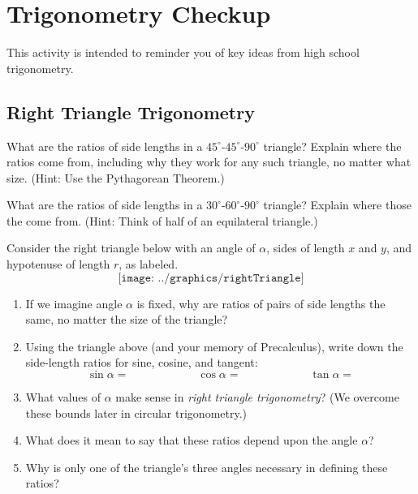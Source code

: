 \newpage 

\section{Trigonometry Checkup}
This activity is intended to reminder you of key ideas from high school trigonometry. 

\subsection{Right Triangle Trigonometry}
\begin{prob}
What are the ratios of side lengths in a $45^\circ$-$45^\circ$-$90^\circ$ triangle?  Explain where the ratios come from, including why they work for any such triangle, no matter what size.  (Hint: Use the Pythagorean Theorem.)
\end{prob}

\vspace{0.1in}

\begin{prob}
What are the ratios of side lengths in a $30^\circ$-$60^\circ$-$90^\circ$ triangle?  Explain where those the come from.  (Hint: Think of half of an equilateral triangle.)
\end{prob}

\vspace{0.1in}

\begin{prob}
Consider the right triangle below with an angle of $\alpha$, sides of length $x$ and $y$, and hypotenuse of length $r$, as labeled.  
$$\texttt{[image: ../graphics/rightTriangle]}$$
\begin{enumerate}
\itemsep 12pt
\item If we imagine angle $\alpha$ is fixed, why are ratios of pairs of side lengths the same, no matter the size of the triangle?
\item Using the triangle above (and your memory of Precalculus), write down the side-length ratios for sine, cosine, and tangent:  
$$\sin\alpha = \hspace{1in} \cos\alpha = \hspace{1in} \tan\alpha =$$
\item What values of $\alpha$ make sense in \emph{right triangle trigonometry}?  (We overcome these bounds later in circular trigonometry.)  
\item What does it mean to say that these ratios depend upon the angle $\alpha$?  
\item Why is only one of the triangle's three angles necessary in defining these ratios?  
\end{enumerate}
\end{prob}

